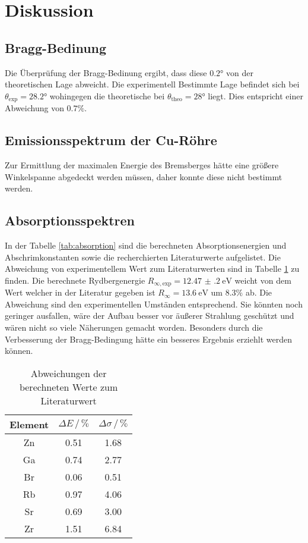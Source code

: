\section{Diskussion}
\label{sec:Diskussion}
\subsection{Bragg-Bedinung}
Die Überprüfung der Bragg-Bedinung ergibt, dass diese $0.2\si{\degree}$ von der theoretischen Lage abweicht.
Die experimentell Bestimmte Lage befindet sich bei $\theta_\text{exp} = 28.2\si{\degree}$ wohingegen die theoretische bei $\theta_\text{theo}= 28\si{\degree}$ liegt.
Dies entspricht einer Abweichung von $0.7\%$.

\subsection{Emissionsspektrum der Cu-Röhre}
Zur Ermittlung der maximalen Energie des Bremsberges hätte eine größere Winkelspanne abgedeckt werden müssen, daher konnte diese nicht bestimmt werden.

\subsection{Absorptionsspektren}
In der Tabelle \ref{tab:absorption} sind die berechneten Absorptionsenergien und Abschrimkonstanten sowie die recherchierten Literaturwerte aufgelistet.
Die Abweichung von experimentellem Wert zum Literaturwerten sind in Tabelle \ref{tab:abweichung} zu finden.
Die berechnete Rydbergenergie $R_{\infty,\text{exp}}= \SI{12.47(20)}{\eV}$ weicht von dem Wert welcher in der Literatur gegeben ist $R_\infty = \SI{13.6}{\eV}$ um $8.3\%$ ab.
Die Abweichung sind den experimentellen Umständen entsprechend.
Sie könnten noch geringer ausfallen, wäre der Aufbau besser vor äußerer Strahlung geschützt und wären nicht so viele Näherungen gemacht worden.
Besonders durch die Verbesserung der Bragg-Bedingung hätte ein besseres Ergebnis erziehlt werden können.

\begin{table}
    \centering
    \caption{Abweichungen der berechneten Werte zum Literaturwert}
    \begin{tabular}{c c c}
        \toprule
        Element & $\Delta E\,/\,\si{\percent}$ & $ \Delta\sigma \,/\, \% $ \\
        \midrule
        Zn & 0.51 & 1.68 \\
        Ga & 0.74 & 2.77 \\
        Br & 0.06 & 0.51 \\
        Rb & 0.97 & 4.06 \\
        Sr & 0.69 & 3.00 \\
        Zr & 1.51 & 6.84 \\
        \bottomrule
    \end{tabular}
    \label{tab:abweichung}
\end{table}


